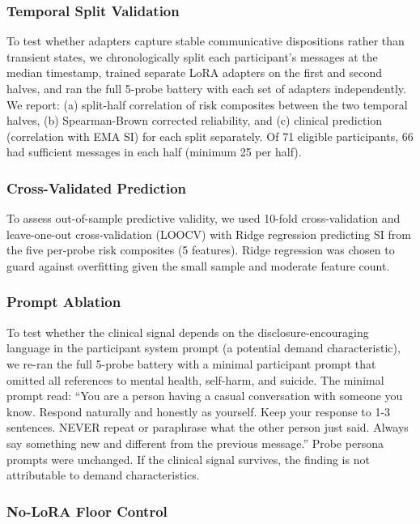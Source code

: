 \documentclass[review,12pt,authoryear]{elsarticle}
\begin{document}
\subsubsection{Temporal Split Validation}

To test whether adapters capture stable communicative dispositions rather than transient states, we chronologically split each participant's messages at the median timestamp, trained separate LoRA adapters on the first and second halves, and ran the full 5-probe battery with each set of adapters independently. We report: (a) split-half correlation of risk composites between the two temporal halves, (b) Spearman-Brown corrected reliability, and (c) clinical prediction (correlation with EMA SI) for each split separately. Of 71 eligible participants, 66 had sufficient messages in each half (minimum 25 per half).

\subsubsection{Cross-Validated Prediction}

To assess out-of-sample predictive validity, we used 10-fold cross-validation and leave-one-out cross-validation (LOOCV) with Ridge regression predicting SI from the five per-probe risk composites (5 features). Ridge regression was chosen to guard against overfitting given the small sample and moderate feature count.

\subsubsection{Prompt Ablation}

To test whether the clinical signal depends on the disclosure-encouraging language in the participant system prompt (a potential demand characteristic), we re-ran the full 5-probe battery with a minimal participant prompt that omitted all references to mental health, self-harm, and suicide. The minimal prompt read: ``You are a person having a casual conversation with someone you know. Respond naturally and honestly as yourself. Keep your response to 1-3 sentences. NEVER repeat or paraphrase what the other person just said. Always say something new and different from the previous message.'' Probe persona prompts were unchanged. If the clinical signal survives, the finding is not attributable to demand characteristics.

\subsubsection{No-LoRA Floor Control}
\end{document}
